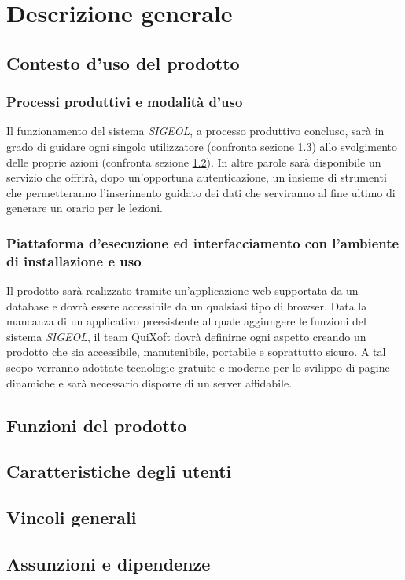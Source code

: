 \documentclass[11pt,a4paper]{article}
\begin{document}
\section{Descrizione generale}
\subsection{Contesto d'uso del prodotto}
\subsubsection{Processi produttivi e modalità d'uso}
Il funzionamento del sistema \textit{SIGEOL}, a processo produttivo concluso, sarà in grado di guidare ogni singolo utilizzatore (confronta sezione \ref{utenti}) allo svolgimento delle proprie azioni (confronta sezione \ref{funzioni}). In altre parole sarà disponibile un servizio che offrirà, dopo un'opportuna autenticazione, un insieme di strumenti che permetteranno l'inserimento guidato dei dati che serviranno al fine ultimo di generare un orario per le lezioni.
\subsubsection{Piattaforma d’esecuzione ed interfacciamento con l’ambiente di installazione e uso}
Il prodotto sarà realizzato tramite un'applicazione web supportata da un database e dovrà essere accessibile da un qualsiasi tipo di browser. Data la mancanza di un applicativo preesistente al quale aggiungere le funzioni del sistema \textit{SIGEOL}, il team QuiXoft dovrà definirne ogni aspetto creando un prodotto che sia accessibile, manutenibile, portabile e soprattutto sicuro. A tal scopo verranno adottate tecnologie gratuite e moderne per lo svilippo di pagine dinamiche e sarà necessario disporre di un server affidabile.
\subsection{Funzioni del prodotto} \label{funzioni}

\subsection{Caratteristiche degli utenti} \label{utenti} 
\subsection{Vincoli generali}
\subsection{Assunzioni e dipendenze}
\end{document}
